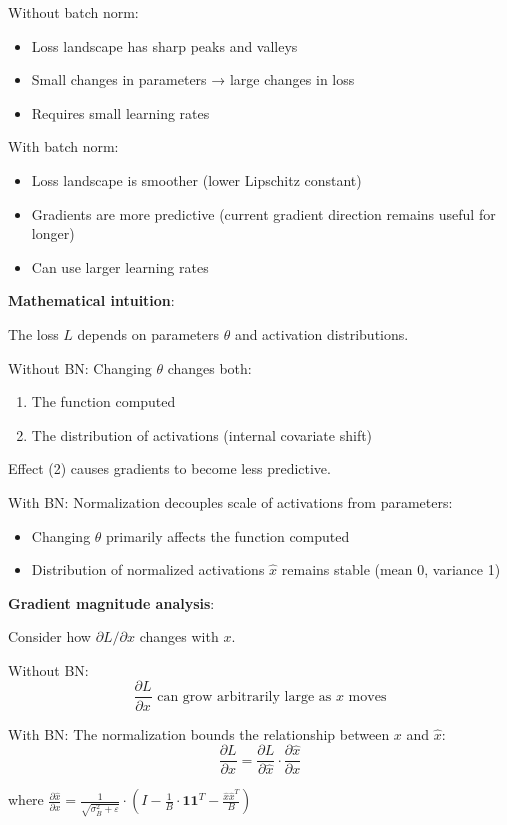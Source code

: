 \documentclass[11pt,oneside]{book}
\begin{document}
Without batch norm:
\begin{itemize}
\item Loss landscape has sharp peaks and valleys
\item Small changes in parameters → large changes in loss
\item Requires small learning rates
\end{itemize}

With batch norm:
\begin{itemize}
\item Loss landscape is smoother (lower Lipschitz constant)
\item Gradients are more predictive (current gradient direction remains useful for longer)
\item Can use larger learning rates
\end{itemize}

\textbf{Mathematical intuition}:

The loss $L$ depends on parameters $\theta$ and activation distributions.

Without BN: Changing $\theta$ changes both:
\begin{enumerate}
\item The function computed
\item The distribution of activations (internal covariate shift)
\end{enumerate}

Effect (2) causes gradients to become less predictive.

With BN: Normalization decouples scale of activations from parameters:
\begin{itemize}
\item Changing $\theta$ primarily affects the function computed
\item Distribution of normalized activations $\hat{x}$ remains stable (mean 0, variance 1)
\end{itemize}

\textbf{Gradient magnitude analysis}:

Consider how $\partial L/\partial x$ changes with $x$.

Without BN:
\[
\frac{\partial L}{\partial x} \text{ can grow arbitrarily large as } x \text{ moves}
\]

With BN: The normalization bounds the relationship between $x$ and $\hat{x}$:
\[
\frac{\partial L}{\partial x} = \frac{\partial L}{\partial \hat{x}} \cdot \frac{\partial \hat{x}}{\partial x}
\]

where $\frac{\partial \hat{x}}{\partial x} = \frac{1}{\sqrt{\sigma_B^2 + \varepsilon}} \cdot \left(I - \frac{1}{B} \cdot \mathbf{1}\mathbf{1}^T - \frac{\hat{x}\hat{x}^T}{B}\right)$
\end{document}
